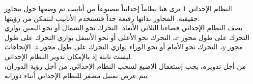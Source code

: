 \begin{surferPage}[إحداثيات 1]{النظام الإحداثي 1}
نرى هنا نظاماً إحداثياً مصنوعاً من أنابيب تم وضعها حول محاور حقيقية. المحاور بذاتها رفيعة جداً فنستخدم الأنابيب لنتمكن من رؤيتها.\\
يصف النظام الإحداثي فضاءنا الثلاثي الأبعاد. التحرك نحو الشمال أو نحو اليمين يوازي التحرك على طول محور $x$، التحرك نحو الأعلى أو نحو الأسفل يوازي التحرك على طول محور $y$، التحرك نحو الأمام أو نحو الوراء يوازي التحرك على طول محور $z$. الإتجاهات ليست ثابتة إذ بالإمكان تدوير النظام الإحداثي.\\ 
\vspace{0.3cm}
من أجل تدويره، يجب إستعمال الإصبع لسحب النظام الإحداثي. من أجل رؤية الدوران، يتم عرض تمثيل مصغر للنظام الإحداثي أثناء دورانه.
\end{surferPage}